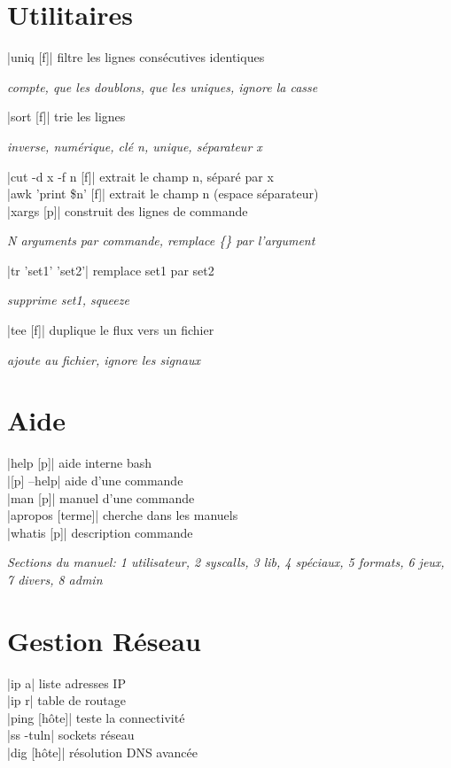 \documentclass[9pt]{extarticle}
\newcommand{\lstcode}[1]{\inlinecode{\detokenize{#1}}}
\newenvironment{cmdblock}{%
  \par\setlength{\parindent}{0pt}\setlength{\parskip}{0pt}%
  \RaggedRight%
}{\par}
\newlength{\cmdoptindent}
\newcommand{\cmdopt}[1]{%
  \hspace*{\cmdoptindent}%
  \begin{minipage}[t]{\dimexpr\linewidth-\cmdoptindent\relax}
    \RaggedRight \itshape #1%
  \end{minipage}\par
}
\begin{document}
\begin{multicols}{4}
\section*{Utilitaires}
\begin{cmdblock}
\code|uniq [f]| \quad filtre les lignes consécutives identiques \\
\cmdopt{\lstcode{-c} compte, \lstcode{-d} que les doublons,
        \lstcode{-u} que les uniques, \lstcode{-i} ignore la casse}
\code|sort [f]| \quad trie les lignes \\
\cmdopt{\lstcode{-r} inverse, \lstcode{-n} numérique,
        \lstcode{-k n} clé n, \lstcode{-u} unique,
        \lstcode{-t x} séparateur x}
\code|cut -d x -f n [f]| \quad extrait le champ n, séparé par x \\
\code|awk '{print \$n}' [f]| \quad extrait le champ n (espace séparateur) \\
\code|xargs [p]| \quad construit des lignes de commande \\
\cmdopt{\lstcode{-n N} N arguments par commande,
        \lstcode{-I \{\}} remplace \{\} par l'argument}
\code|tr 'set1' 'set2'| \quad remplace set1 par set2 \\
\cmdopt{\lstcode{-d} supprime set1, \lstcode{-s} squeeze}
\code|tee [f]| \quad duplique le flux vers un fichier \\
\cmdopt{\lstcode{-a} ajoute au fichier, \lstcode{-i} ignore les signaux}
\end{cmdblock}

\section*{Aide}
\begin{cmdblock}
\code|help [p]| \quad aide interne bash \\
\code|[p] --help| \quad aide d'une commande \\
\code|man [p]| \quad manuel d'une commande \\
\code|apropos [terme]| \quad cherche dans les manuels \\
\code|whatis [p]| \quad description commande \\
\end{cmdblock}

\emph{Sections du manuel: 1 utilisateur, 2 syscalls, 3 lib, 4 spéciaux, 5 formats, 6 jeux, 7 divers, 8 admin} \\

\section*{Gestion Réseau}
\begin{cmdblock}
\code|ip a| \quad liste adresses IP \\
\code|ip r| \quad table de routage \\
\code|ping [hôte]| \quad teste la connectivité \\
\code|ss -tuln| \quad sockets réseau \\
\code|dig [hôte]| \quad résolution DNS avancée \\
\end{cmdblock}


\end{multicols}
\end{document}
